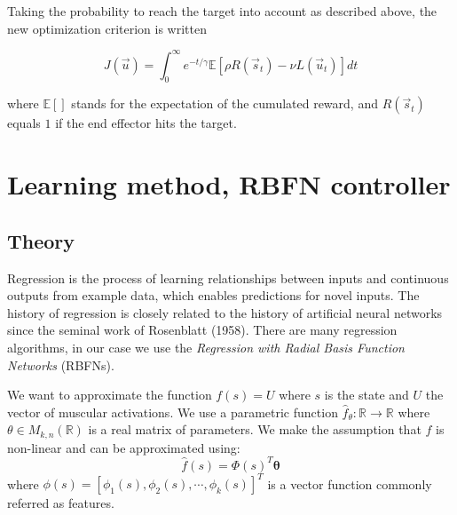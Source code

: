 \documentclass[pdftex,a4paper,11pt]{report}
\begin{document}
Taking the probability to reach the target into account as described above, the new optimization criterion is written

\begin{equation}
\label{eq:expectation}
 J(\vec{u}) = \int_0^{\infty} e^{-t/\gamma} \mathbb{E}[ \rho R(\vec{s}_t) - \nu L(\vec{u}_t) ] dt
\end{equation}

where $\mathbb{E}[]$ stands for the expectation of the cumulated reward, and $R(\vec{s}_t)$  equals $1$ if the end effector hits the target.

\section{Learning method, RBFN controller}
\label{sec_rbfn}

\subsection{Theory}

Regression is the process of learning relationships between inputs and continuous outputs from example data, which enables predictions for novel inputs.
The history of regression is closely related to the history of artificial neural networks since the seminal work of Rosenblatt (1958).
There are many regression algorithms, in our case we use the \textit{Regression with Radial Basis Function Networks} (RBFNs).

We want to approximate the function $f(s) = U$ where $s$ is the state and $U$ the vector of muscular activations.
We use a parametric function $\hat{f}_\theta: \mathbb{R} \rightarrow \mathbb{R}$ where $\theta \in M_{k,n}(\mathbb{R})$ is a real matrix of parameters. We make the assumption that $f$ is non-linear and can be approximated using:
\begin{equation}
	\hat{f}(s) = \Phi(s)^T\boldsymbol{\theta}
\end{equation}
where  
$\phi(s) = [\phi_1(s), \phi_2(s), \cdots, \phi_k(s)]^T$
is a vector function commonly referred as features.
\end{document}
